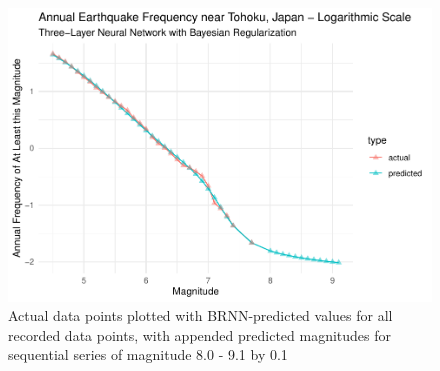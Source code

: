 \begin{figure}[H]
    \center
    \includegraphics[width=0.8\linewidth]{earthquakes_files/figure-latex/unnamed-chunk-11-1.pdf}
    \caption{\footnotesize{Actual data points plotted with BRNN-predicted values for all recorded data points, with appended predicted magnitudes for sequential series of magnitude 8.0 - 9.1 by 0.1}}
    \label{tohoku_brnn}
\end{figure}

